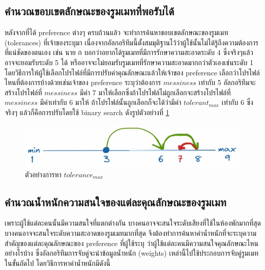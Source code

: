 \subsection{คำนวณขอบเขตลักษณะของรูมเมทที่พอรับได้}
หลังจากที่ได้ preference ต่างๆ ครบถ้วนแล้ว จะทำการค้นหาขอบเขตลักษณะของรูมเมท (tolerances) ที่เจ้าของระบุมา
เนื่องจากอัลกอริทึมนี้ตั้งสมมุติฐานไว้ว่าผู้ใช้นั้นไม่ได้รู้ถึงความต้องการที่แน่ชัดของตนเอง เช่น 
นาย ก บอกว่าอยากได้รูมเมทที่มีการรักษาความสะอาดระดับ 4 ซึ่งจริงๆแล้ว อาจจะยอมรับระดับ 5 ได้ หรืออาจจะไม่ยอมรับรูมเมทที่รักษาความสะอาดมากกว่าตัวเองเช่นระดับ 1
โดยวิธีการให้ผู้ใช้เลือกโปรไฟล์ที่มีการปรับค่าคุณลักษณะแล้วให้เจ้าของ preference เลือกว่าโปรไฟล์ไหนที่ต้องการบ้างด้วยเช่นเจ้าของ preference ระบุว่าต้องการ $messiness$ เท่ากับ 5
อัลกอริทึมจะสร้างโปรไฟล์ที่ $messiness$ มีค่า 7 มาให้เลือกซึ่งถ้าโปรไฟล์ไม่ถูกเลือกจะสร้างโปรไฟล์ที่ $messiness$ มีค่าเท่ากับ 6 มาให้ ถ้าโปรไฟล์นั้นถูกเลือกก็จะได้ว่ามีค่า $tolerant_{max}$ เท่ากับ 6
ซึ่งจริงๆ แล้วก็คือการปรับโดยใช้ binary search ดังรูปตัวอย่างที่ \ref{fig:tolerance-binary}
\begin{figure}[ht]
  \begin{center}
    \includegraphics[width=\linewidth]{photo/diagram/binary_tolerance.jpeg}
  \end{center}
  \caption{ตัวอย่างการหา $\mathit{tolerance_\mathit{max}}$}
  \label{fig:tolerance-binary}
\end{figure}

\subsection{คำนวณน้ำหนักความสนใจของแต่ละคุณลักษณะของรูมเมท}
เพราะผู้ใช้แต่ละคนนั้นมีความสนใจที่แตกต่างกัน บางคนอาจจะสนใจระดับเสียงที่ใช้ในห้องพักมากที่สุด บางคนอาจจะสนใจระดับความสะอาดของรูมเมทมากที่สุด 
จึงต้องทำการค้นหาค่าน้ำหนักที่จะระบุความสำคัญของแต่ละคุณลักษณะของ preference ที่ผู้ใช้ระบุ ว่าผู้ใช้แต่ละคนมีความสนใจคุณลักษณะไหนอย่างไรบ้าง  
ซึ่งอัลกอริทึมการจับคู่จะนำข้อมูลน้ำหนัก (weights) เหล่านี้ไปใช้ประกอบการจับคู่รูมเมทในขั้นถัดไป โดยวิธีการหาค่าน้ำหนักมีดังนี้
